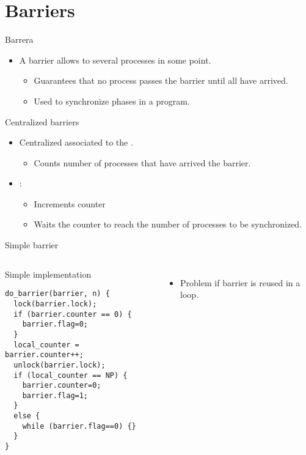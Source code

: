 \section{Barriers}

\begin{frame}[t]{Barrera}
\begin{itemize}
  \item A barrier allows to  several processes in some point.
  
    \begin{itemize}
      \item Guarantees that no process passes the barrier until all have arrived.
      \item Used to synchronize phases in a program.
    \end{itemize}
\end{itemize}
\end{frame}

\begin{frame}[t]{Centralized barriers}
\begin{itemize}
  \item Centralized  associated to the .
    \begin{itemize}
      \item Counts number of processes that have arrived the barrier.
    \end{itemize}

  \item {}:
    \begin{itemize}
      \item Increments counter
      \item Waits the counter to reach the number of processes to be synchronized.
    \end{itemize}
\end{itemize}
\end{frame}

\begin{frame}[t,fragile]{Simple barrier}
\begin{columns}

\begin{block}{Simple implementation}
\begin{lstlisting}
do_barrier(barrier, n) {
  lock(barrier.lock);
  if (barrier.counter == 0) {
    barrier.flag=0;
  }
  local_counter = barrier.counter++;
  unlock(barrier.lock);
  if (local_counter == NP) {
    barrier.counter=0;
    barrier.flag=1;
  }
  else {
    while (barrier.flag==0) {}
  }
}
\end{lstlisting}
\end{block}

\begin{itemize}
  \item Problem if barrier is reused in a loop.
\end{itemize}

\end{columns}
\end{frame}


